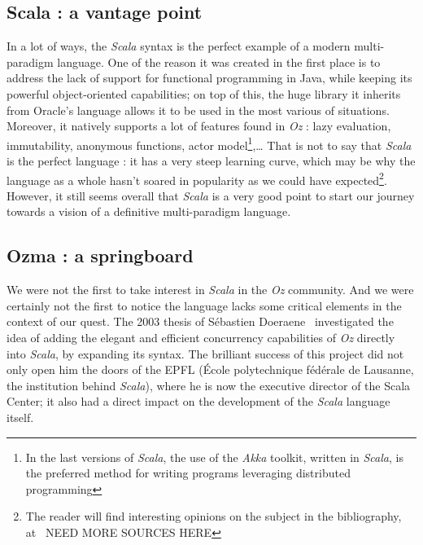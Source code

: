 \subsection{Scala : a vantage point}\label{subsec:ch1-scala}
In a lot of ways, the \textit{Scala} syntax is the perfect example of a modern multi-paradigm language.
One of the reason it was created in the first place is to address the lack of support for functional programming in Java, while keeping its powerful object-oriented capabilities;
on top of this, the huge library it inherits from Oracle's language allows it to be used in the most various of situations.\newline
Moreover, it natively supports a lot of features found in \textit{Oz} : lazy evaluation, immutability, anonymous functions, actor model\footnote{In the last versions of \textit{Scala}, the use of the \textit{Akka} toolkit\cite{akka}, written in \textit{Scala}, is the preferred method for writing programs leveraging distributed programming},\ldots
That is not to say that \textit{Scala} is the perfect language :
it has a very steep learning curve, which may be why the language as a whole hasn't soared in popularity as we could have expected\footnote{The reader will find interesting opinions on the subject in the bibliography, at~\cite{scalaOpinion1} NEED MORE SOURCES HERE}.
However, it still seems overall that \textit{Scala} is a very good point to start our journey towards a vision of a definitive multi-paradigm language.

\subsection{Ozma : a springboard}\label{subsec:ch1-ozma}
We were not the first to take interest in \textit{Scala} in the \textit{Oz} community.
And we were certainly not the first to notice the language lacks some critical elements in the context of our quest.\newline
The 2003 thesis of Sébastien Doeraene~\cite{Ozma} investigated the idea of adding the elegant and efficient concurrency capabilities of \textit{Oz} directly into \textit{Scala}, by expanding its syntax.
The brilliant success of this project did not only open him the doors of the EPFL (École polytechnique fédérale de Lausanne, the institution behind \textit{Scala}), where he is now the executive director of the Scala Center;
it also had a direct impact on the development of the \textit{Scala} language itself.\newline

